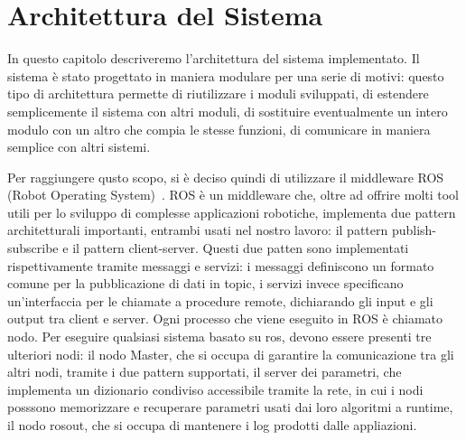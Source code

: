 \chapter{Architettura del Sistema}
\label{capitolo4}
\thispagestyle{empty}

\begin{quotation}
{\footnotesize
\noindent \emph{}
\begin{flushright}
\end{flushright}
}
\end{quotation}
\vspace{0.5cm}

In questo capitolo descriveremo l'architettura del sistema implementato. Il sistema è stato progettato in maniera modulare per una serie di motivi: questo tipo di architettura permette di riutilizzare i moduli sviluppati, di estendere semplicemente il sistema con altri moduli, di sostituire eventualmente un intero modulo con un altro che compia le stesse funzioni, di comunicare in maniera semplice con altri sistemi. 

Per raggiungere qusto scopo, si è deciso quindi di utilizzare il middleware ROS (Robot Operating System)~\cite{quigley2009ros}.
ROS è un middleware che, oltre ad offrire molti tool utili per lo sviluppo di complesse applicazioni robotiche, implementa due pattern architetturali importanti, entrambi usati nel nostro lavoro: il pattern publish-subscribe e il pattern client-server.
Questi due patten sono implementati rispettivamente tramite messaggi e servizi: i messaggi definiscono un formato comune per la pubblicazione di dati in topic, i servizi invece specificano un'interfaccia per le chiamate a procedure remote, dichiarando gli input e gli output tra client e server.
Ogni processo che viene eseguito in ROS è chiamato nodo. Per eseguire qualsiasi sistema basato su ros, devono essere presenti tre ulteriori nodi: il nodo Master, che si occupa di garantire la comunicazione tra gli altri nodi, tramite i due pattern supportati, il server dei parametri, che implementa un dizionario condiviso accessibile tramite la rete, in cui i nodi posssono memorizzare e recuperare parametri usati dai loro algoritmi a runtime, il nodo rosout, che si occupa di mantenere i log prodotti dalle appliazioni.


